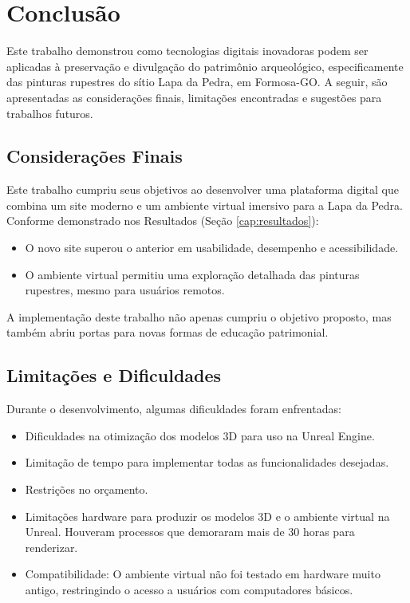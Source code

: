 \chapter{Conclusão} \label{cap:conclusao}

Este trabalho demonstrou como tecnologias digitais inovadoras podem ser aplicadas à preservação e divulgação do patrimônio arqueológico, especificamente das pinturas rupestres do sítio Lapa da Pedra, em Formosa-GO. A seguir, são apresentadas as considerações finais, limitações encontradas e sugestões para trabalhos futuros.

\section{Considerações Finais} \label{sec:consideracoes}

Este trabalho cumpriu seus objetivos ao desenvolver uma plataforma digital que combina um site moderno e um ambiente virtual imersivo para a Lapa da Pedra. Conforme demonstrado nos Resultados (Seção \ref{cap:resultados}):
\begin{itemize}
    \item O novo site superou o anterior em usabilidade, desempenho e acessibilidade.
    \item O ambiente virtual permitiu uma exploração detalhada das pinturas rupestres, mesmo para usuários remotos.
\end{itemize}

A implementação deste trabalho não apenas cumpriu o objetivo proposto, mas também abriu portas para novas formas de educação patrimonial.

\section{Limitações e Dificuldades}
\label{sec:limitações}
Durante o desenvolvimento, algumas dificuldades foram enfrentadas:
\begin{itemize}
    \item Dificuldades na otimização dos modelos 3D para uso na Unreal Engine.
    \item Limitação de tempo para implementar todas as funcionalidades desejadas.
    \item Restrições no orçamento.
    \item Limitações hardware para produzir os modelos 3D e o ambiente virtual na Unreal. Houveram processos que demoraram mais de 30 horas para renderizar.
    \item Compatibilidade: O ambiente virtual não foi testado em hardware muito antigo, restringindo o acesso a usuários com computadores básicos.
\end{itemize}

